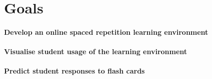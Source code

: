 \section{Goals}
\paragraph{Develop an online spaced repetition learning environment}
\paragraph{Visualise student usage of the learning environment}
\paragraph{Predict student responses to flash cards}
